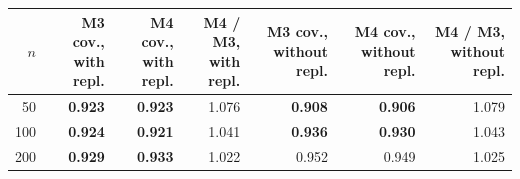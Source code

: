 \begin{tabular}{rrrrrrr}
\toprule
$n$ & M3 cov., with repl. & M4 cov., with repl. & M4 / M3, with repl. & M3 cov., without repl. & M4 cov., without repl. & M4 / M3, without repl. \\
\midrule
50 & \textbf{0.923} & \textbf{0.923} & 1.076 & \textbf{0.908} & \textbf{0.906} & 1.079 \\
100 & \textbf{0.924} & \textbf{0.921} & 1.041 & \textbf{0.936} & \textbf{0.930} & 1.043 \\
200 & \textbf{0.929} & \textbf{0.933} & 1.022 & 0.952 & 0.949 & 1.025 \\
\bottomrule
\end{tabular}
